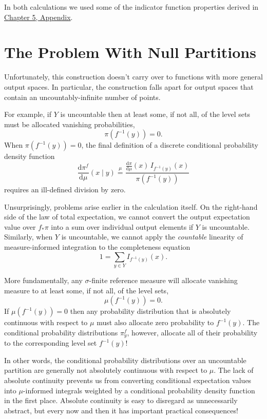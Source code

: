 \documentclass[
  letterpaper,
  DIV=11,
  numbers=noendperiod]{scrartcl}
\begin{document}
In both calculations we used some of the indicator function properties
derived in
\href{http://www.symplectomorphic.com//assets/chapters_html/expectation_values.html\#sec:app}{Chapter
5, Appendix}.

\section{The Problem With Null
Partitions}\label{the-problem-with-null-partitions}

Unfortunately, this construction doesn't carry over to functions with
more general output spaces. In particular, the construction falls apart
for output spaces that contain an uncountably-infinite number of points.

For example, if \(Y\) is uncountable then at least some, if not all, of
the level sets must be allocated vanishing probabilities, \[
\pi( f^{-1}(y) ) = 0.
\] When \(\pi( f^{-1}(y) ) = 0\), the final definition of a discrete
conditional probability density function \[
\frac{ \mathrm{d}  \pi^{f} }{ \mathrm{d}  \mu  }( x \mid y )
\overset{ \mu }{ = }
\frac{
  \frac{ \mathrm{d}  \pi }{ \mathrm{d}  \mu  }(x) \, I_{f^{-1}(y)}(x)
}{
  \pi ( f^{-1}(y) )
}
\] requires an ill-defined division by zero.

Unsurprisingly, problems arise earlier in the calculation itself. On the
right-hand side of the law of total expectation, we cannot convert the
output expectation value over \(f_{*} \pi\) into a sum over individual
output elements if \(Y\) is uncountable. Similarly, when \(Y\) is
uncountable, we cannot apply the \emph{countable} linearity of
measure-informed integration to the completeness equation \[
1 = \sum_{y \in Y} I_{f^{-1}(y)}(x).
\]

More fundamentally, any \(\sigma\)-finite reference measure will
allocate vanishing measure to at least some, if not all, of the level
sets, \[
\mu( f^{-1}(y) ) = 0.
\] If \(\mu(f^{-1}(y)) = 0\) then any probability distribution that is
absolutely continuous with respect to \(\mu\) must also allocate zero
probability to \(f^{-1}(y)\). The conditional probability distributions
\(\pi^{f}_{y}\), however, allocate all of their probability to the
corresponding level set \(f^{-1}(y)\)!

In other words, the conditional probability distributions over an
uncountable partition are generally not absolutely continuous with
respect to \(\mu\). The lack of absolute continuity prevents us from
converting conditional expectation values into \(\mu\)-informed
integrals weighted by a conditional probability density function in the
first place. Absolute continuity is easy to disregard as unnecessarily
abstract, but every now and then it has important practical
consequences!
\end{document}
